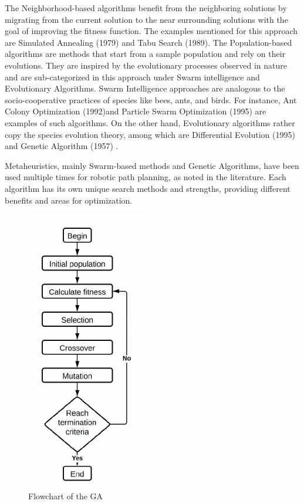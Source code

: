 The Neighborhood-based algorithms benefit from the neighboring solutions by migrating from the current solution to 
the near surrounding solutions with the goal of improving the fitness function. The examples mentioned for this 
approach are Simulated Annealing (1979) and Tabu Search (1989). The Population-based algorithms are methods that start from a sample population and rely on their evolutions. 
They are inspired by the evolutionary processes observed in nature and are sub-categorized in this approach under 
Swarm intelligence and Evolutionary Algorithms. 
Swarm Intelligence approaches are analogous to the socio-cooperative practices of species like bees, ants, and birds. 
For instance, Ant Colony Optimization (1992)and Particle Swarm Optimization (1995) are examples of such algorithms. 
On the other hand, Evolutionary algorithms rather copy the species evolution theory, among which are Differential 
Evolution (1995) and Genetic Algorithm (1957) \cite{R37}.

Metaheuristics, mainly Swarm-based methods and Genetic Algorithms, 
have been used multiple times for robotic path planning, as noted in the literature. 
Each algorithm has its own unique search methods and strengths, providing different benefits and 
areas for optimization.
  


\begin{figure}[H]
    \centering
    \includegraphics[width=2in]{images/Chap1/GA.jpg}
    \caption{Flowchart of the GA \cite{R39}}
    \label{GA}
\end{figure}

